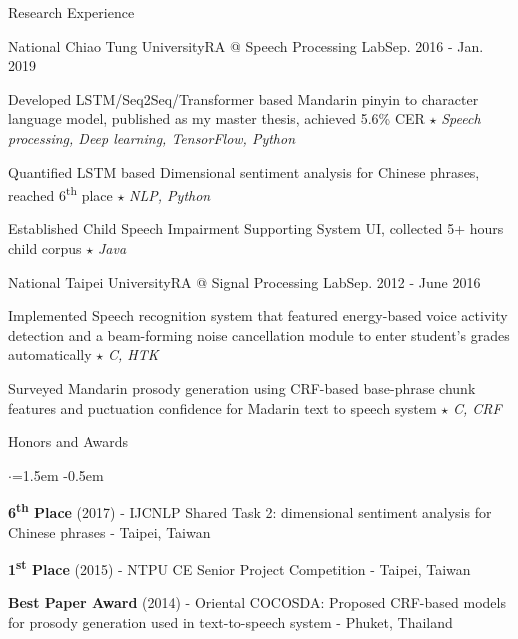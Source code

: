 \documentclass{resume_short} %
\newcommand{\ts}{\textsuperscript}
\begin{document}
\begin{rSection}{Research Experience}
    \begin{rSubsection3}{National Chiao Tung University}{RA @ Speech Processing Lab}{Sep. 2016 - Jan. 2019}
        \item Developed LSTM/Seq2Seq/Transformer based Mandarin pinyin to character language model, published as my master thesis, achieved 5.6\% CER \quad$\star$ {\em Speech processing, Deep learning, TensorFlow, Python}
        \item Quantified LSTM based Dimensional sentiment analysis for Chinese phrases, reached 6\ts{th} place \quad $\star$ {\em NLP, Python}
        \item Established Child Speech Impairment Supporting System UI, collected 5+ hours child corpus \quad $\star$ {\em Java}
    \end{rSubsection3}
    \begin{rSubsection3}{National Taipei University}{RA @ Signal Processing Lab}{Sep. 2012 - June 2016}
        \item Implemented Speech recognition system that featured energy-based voice activity detection and a beam-forming noise cancellation module to enter student’s grades automatically \quad$\star$ {\em C, HTK}
        \item Surveyed Mandarin prosody generation using CRF-based base-phrase chunk features and puctuation confidence for Madarin text to speech system \quad$\star$ {\em C, CRF}
    \end{rSubsection3}
\end{rSection}


\begin{rSection}{Honors and Awards}
    \begin{list}{$\cdot$}{\leftmargin=1.5em}
        \itemsep -0.5em \vspace{-0.25em} %
        \item {\bf 6\ts{th} Place} (2017) - IJCNLP Shared Task 2: dimensional sentiment analysis for Chinese phrases - Taipei, Taiwan
        \item {\bf 1\ts{st} Place} (2015) - NTPU CE Senior Project Competition - Taipei, Taiwan
        \item {\bf Best Paper Award} (2014) - Oriental COCOSDA: Proposed CRF-based models for prosody generation used in text-to-speech system - Phuket, Thailand
    \end{list}
\end{rSection}
\end{document}
